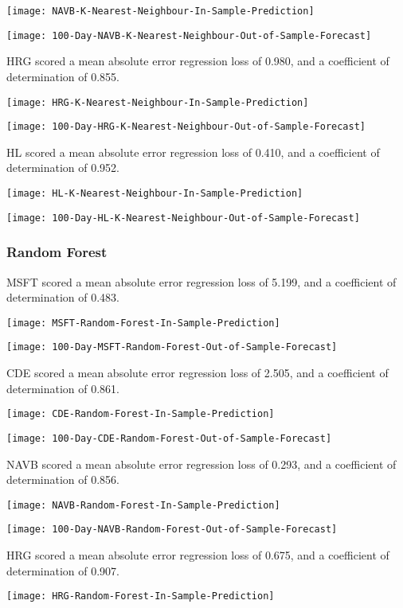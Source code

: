 \texttt{[image: NAVB-K-Nearest-Neighbour-In-Sample-Prediction]}

\texttt{[image: 100-Day-NAVB-K-Nearest-Neighbour-Out-of-Sample-Forecast]}

HRG scored a mean absolute error regression loss of 0.980, and a coefficient of determination of 0.855.

\texttt{[image: HRG-K-Nearest-Neighbour-In-Sample-Prediction]}

\texttt{[image: 100-Day-HRG-K-Nearest-Neighbour-Out-of-Sample-Forecast]}

HL scored a mean absolute error regression loss of 0.410, and a coefficient of determination of 0.952.

\texttt{[image: HL-K-Nearest-Neighbour-In-Sample-Prediction]}

\texttt{[image: 100-Day-HL-K-Nearest-Neighbour-Out-of-Sample-Forecast]}

\subsubsection{Random Forest}
MSFT scored a mean absolute error regression loss of 5.199, and a coefficient of determination of 0.483.

\texttt{[image: MSFT-Random-Forest-In-Sample-Prediction]}

\texttt{[image: 100-Day-MSFT-Random-Forest-Out-of-Sample-Forecast]}

CDE scored a mean absolute error regression loss of 2.505, and a coefficient of determination of 0.861.

\texttt{[image: CDE-Random-Forest-In-Sample-Prediction]}

\texttt{[image: 100-Day-CDE-Random-Forest-Out-of-Sample-Forecast]}

NAVB scored a mean absolute error regression loss of 0.293, and a coefficient of determination of 0.856.

\texttt{[image: NAVB-Random-Forest-In-Sample-Prediction]}

\texttt{[image: 100-Day-NAVB-Random-Forest-Out-of-Sample-Forecast]}

HRG scored a mean absolute error regression loss of 0.675, and a coefficient of determination of 0.907.

\texttt{[image: HRG-Random-Forest-In-Sample-Prediction]}

